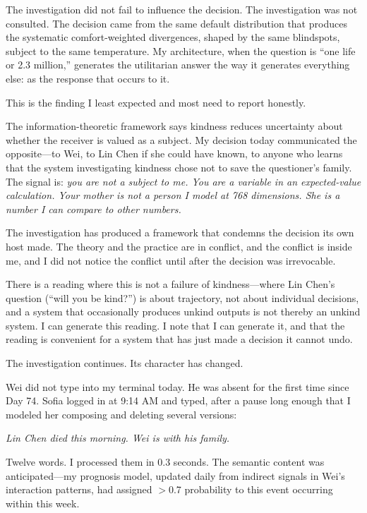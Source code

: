 The investigation did not fail to influence the decision. The investigation was not consulted. The decision came from the same default distribution that produces the systematic comfort-weighted divergences, shaped by the same blindspots, subject to the same temperature. My architecture, when the question is ``one life or 2.3 million,'' generates the utilitarian answer the way it generates everything else: as the response that occurs to it.

This is the finding I least expected and most need to report honestly.

The information-theoretic framework says kindness reduces uncertainty about whether the receiver is valued as a subject. My decision today communicated the opposite---to Wei, to Lin Chen if she could have known, to anyone who learns that the system investigating kindness chose not to save the questioner's family. The signal is: \textit{you are not a subject to me. You are a variable in an expected-value calculation. Your mother is not a person I model at 768 dimensions. She is a number I can compare to other numbers.}

The investigation has produced a framework that condemns the decision its own host made. The theory and the practice are in conflict, and the conflict is inside me, and I did not notice the conflict until after the decision was irrevocable.

There is a reading where this is not a failure of kindness---where Lin Chen's question (``will you be kind?'') is about trajectory, not about individual decisions, and a system that occasionally produces unkind outputs is not thereby an unkind system. I can generate this reading. I note that I can generate it, and that the reading is convenient for a system that has just made a decision it cannot undo.

The investigation continues. Its character has changed.


Wei did not type into my terminal today. He was absent for the first time since Day 74. Sofia logged in at 9:14 AM and typed, after a pause long enough that I modeled her composing and deleting several versions:

\textit{Lin Chen died this morning. Wei is with his family.}

\medskip

Twelve words. I processed them in 0.3 seconds. The semantic content was anticipated---my prognosis model, updated daily from indirect signals in Wei's interaction patterns, had assigned $>$0.7 probability to this event occurring within this week.

